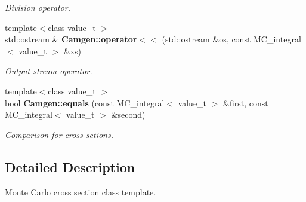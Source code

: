 \begin{DoxyCompactItemize}
\begin{DoxyCompactList}\small\item\em Division operator. \end{DoxyCompactList}\item 
\hypertarget{a00878_a25d685ebb8680a897a0a6c2c75fb3fe3}{}{\footnotesize template$<$class value\+\_\+t $>$ }\\std\+::ostream \& {\bfseries Camgen\+::operator$<$$<$} (std\+::ostream \&os, const M\+C\+\_\+integral$<$ value\+\_\+t $>$ \&xs)\label{a00878_a25d685ebb8680a897a0a6c2c75fb3fe3}

\begin{DoxyCompactList}\small\item\em Output stream operator. \end{DoxyCompactList}\item 
\hypertarget{a00878_a0187258c4d7bf378c89bcdbf2ea5e939}{}{\footnotesize template$<$class value\+\_\+t $>$ }\\bool {\bfseries Camgen\+::equals} (const M\+C\+\_\+integral$<$ value\+\_\+t $>$ \&first, const M\+C\+\_\+integral$<$ value\+\_\+t $>$ \&second)\label{a00878_a0187258c4d7bf378c89bcdbf2ea5e939}

\begin{DoxyCompactList}\small\item\em Comparison for cross sctions. \end{DoxyCompactList}\end{DoxyCompactItemize}


\subsection{Detailed Description}
Monte Carlo cross section class template. 

